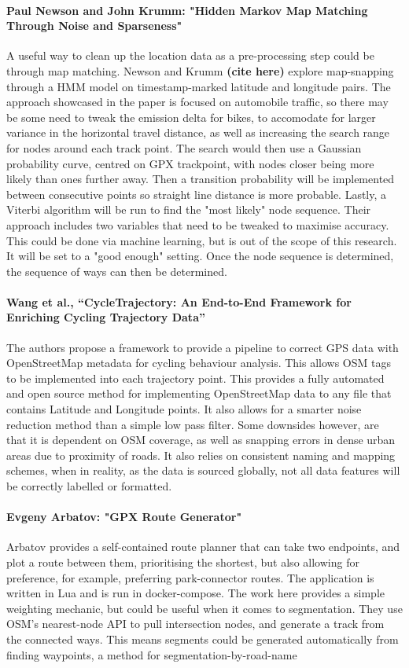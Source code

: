 \documentclass[12pt,a4paper]{report}
\begin{document}
\paragraph{Paul Newson and John Krumm: "Hidden Markov Map Matching Through Noise and Sparseness"}
A useful way to clean up the location data as a pre-processing step could be through map matching. Newson and Krumm \textbf{(cite here)} explore map-snapping through a HMM model on timestamp-marked latitude and longitude pairs.
The approach showcased in the paper is focused on automobile traffic, so there may be some need to tweak the emission delta for bikes, to accomodate for larger variance in the horizontal travel distance, as well as increasing
the search range for nodes around each track point. The search would then use a Gaussian probability curve, centred on GPX trackpoint, with nodes closer being more likely than ones further away. Then a transition probability will be implemented between consecutive points
so straight line distance is more probable. Lastly, a Viterbi algorithm will be run to find the "most likely" node sequence. Their approach includes two variables that need to be tweaked to maximise accuracy. This could be done via machine learning, but is out of the scope of this research. It will be set to a "good enough" setting.
Once the node sequence is determined, the sequence of ways can then be determined.


\paragraph{Wang et al., “CycleTrajectory: An End-to-End Framework for Enriching Cycling Trajectory Data”}
The authors propose a framework to provide a pipeline to correct GPS data with OpenStreetMap metadata for cycling behaviour analysis. This allows
OSM tags to be implemented into each trajectory point. This provides a fully automated and open source method for implementing OpenStreetMap data to any file that contains Latitude and Longitude points.
It also allows for a smarter noise reduction method than a simple low pass filter. Some downsides however, are that it is dependent on OSM coverage, as well as snapping errors in dense urban areas due to proximity of roads. It also relies on consistent naming and mapping schemes, when
in reality, as the data is sourced globally, not all data features will be correctly labelled or formatted.

\paragraph{Evgeny Arbatov: "GPX Route Generator"}
Arbatov provides a self-contained route planner that can take two endpoints, and plot a route between them, prioritising the shortest, but also allowing for preference, for example, preferring park-connector routes.
The application is written in Lua and is run in docker-compose. The work here provides a simple weighting mechanic, but could be useful when it comes to segmentation.
They use OSM's nearest-node API to pull intersection nodes, and generate a track from the connected ways. This means segments could be generated automatically from finding waypoints, a method for segmentation-by-road-name
\end{document}
